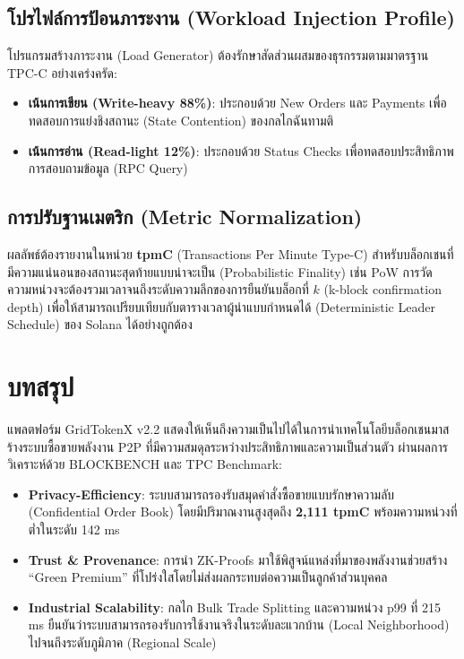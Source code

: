\documentclass[conference,10pt]{IEEEtran}
\begin{document}
\subsection{โปรไฟล์การป้อนภาระงาน (Workload Injection Profile)}
โปรแกรมสร้างภาระงาน (Load Generator) ต้องรักษาสัดส่วนผสมของธุรกรรมตามมาตรฐาน TPC-C อย่างเคร่งครัด:
\begin{itemize}
    \item \textbf{เน้นการเขียน (Write-heavy 88\%)}: ประกอบด้วย New Orders และ Payments เพื่อทดสอบการแย่งชิงสถานะ (State Contention) ของกลไกฉันทามติ
    \item \textbf{เน้นการอ่าน (Read-light 12\%)}: ประกอบด้วย Status Checks เพื่อทดสอบประสิทธิภาพการสอบถามข้อมูล (RPC Query)
\end{itemize}

\subsection{การปรับฐานเมตริก (Metric Normalization)}
ผลลัพธ์ต้องรายงานในหน่วย \textbf{tpmC} (Transactions Per Minute Type-C) สำหรับบล็อกเชนที่มีความแน่นอนของสถานะสุดท้ายแบบน่าจะเป็น (Probabilistic Finality) เช่น PoW การวัดความหน่วงจะต้องรวมเวลาจนถึงระดับความลึกของการยืนยันบล็อกที่ $k$ (k-block confirmation depth) เพื่อให้สามารถเปรียบเทียบกับตารางเวลาผู้นำแบบกำหนดได้ (Deterministic Leader Schedule) ของ Solana ได้อย่างถูกต้อง

\section{บทสรุป}
แพลตฟอร์ม GridTokenX v2.2 แสดงให้เห็นถึงความเป็นไปได้ในการนำเทคโนโลยีบล็อกเชนมาสร้างระบบซื้อขายพลังงาน P2P ที่มีความสมดุลระหว่างประสิทธิภาพและความเป็นส่วนตัว ผ่านผลการวิเคราะห์ด้วย BLOCKBENCH และ TPC Benchmark:

\begin{itemize}
    \item \textbf{Privacy-Efficiency}: ระบบสามารถรองรับสมุดคำสั่งซื้อขายแบบรักษาความลับ (Confidential Order Book) โดยมีปริมาณงานสูงสุดถึง \textbf{2,111 tpmC} พร้อมความหน่วงที่ต่ำในระดับ 142 ms
    \item \textbf{Trust \& Provenance}: การนำ ZK-Proofs มาใช้พิสูจน์แหล่งที่มาของพลังงานช่วยสร้าง ``Green Premium'' ที่โปร่งใสโดยไม่ส่งผลกระทบต่อความเป็นลูกค้าส่วนบุคคล
    \item \textbf{Industrial Scalability}: กลไก Bulk Trade Splitting และความหน่วง p99 ที่ 215 ms ยืนยันว่าระบบสามารถรองรับการใช้งานจริงในระดับละแวกบ้าน (Local Neighborhood) ไปจนถึงระดับภูมิภาค (Regional Scale)
\end{itemize}
\end{document}

